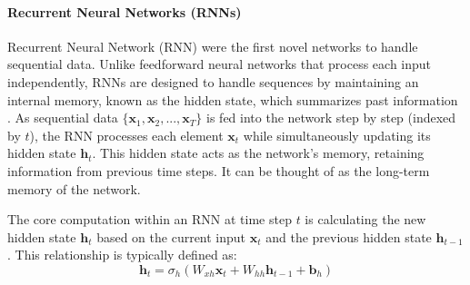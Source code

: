 \paragraph{\textbf{Recurrent Neural Networks (RNNs)}}
\label{sec:rnn}
Recurrent Neural Network (RNN) were the first novel networks to handle sequential data. Unlike feedforward neural networks that process each input independently, RNNs are designed to handle sequences by maintaining an internal memory, known as the hidden state, which summarizes past information \autocite{geron2022hands}. As sequential data \( \{ \bm{x}_1, \bm{x}_2, ..., \bm{x}_T \} \) is fed into the network step by step (indexed by \( t \)), the RNN processes each element \( \bm{x}_t \) while simultaneously updating its hidden state \( \bm{h}_t \). This hidden state acts as the network's memory, retaining information from previous time steps. It can be thought of as the long-term memory of the network.

The core computation within an RNN at time step \( t \) is calculating the new hidden state \( \bm{h}_t \) based on the current input \( \bm{x}_t \) and the previous hidden state \( \bm{h}_{t-1} \). This relationship is typically defined as:
\begin{equation}
  \bm{h}_t = \sigma_h (W_{xh} \bm{x}_t + W_{hh} \bm{h}_{t-1} + \bm{b}_h)
  \label{eq:rnn_hidden_state}
\end{equation}

